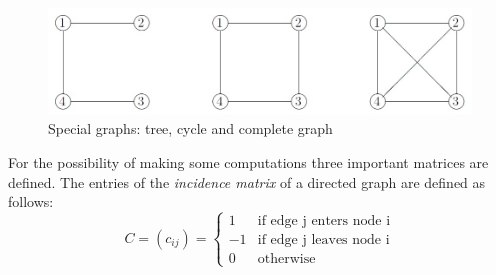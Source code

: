 \documentclass[12pt]{report}
\begin{document}
%	
%	
\begin{figure}[h]
\centering
\includegraphics[scale=.6]{specgraphs}
\caption{Special graphs: tree, cycle and complete graph}
\label{FIG:abb2}
\end{figure}
For the possibility of making some computations three important matrices are defined. The entries of the \textit{incidence matrix} of a directed graph are defined as follows: \\
\begin{equation}
C=(c_{ij})= \left\{ \begin{array}{rll}
					1 & \mbox{if edge j enters node i} \\
					-1 & \mbox{if edge j leaves node i} \\
					0 & \mbox{otherwise}
					\end{array}\right.
					\label{EQ:gleichung1}
\end{equation}
\end{document}
